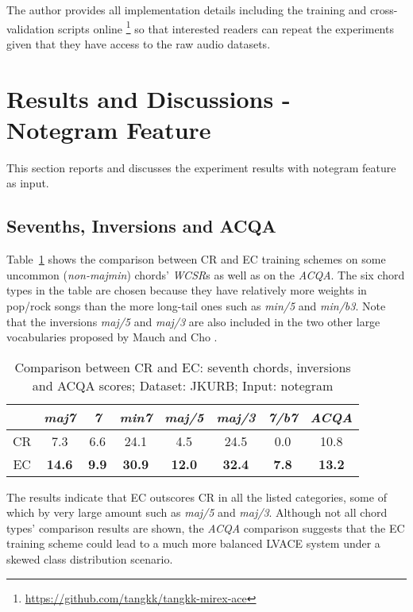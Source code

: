 The author provides all implementation details including the training and cross-validation scripts online \footnote{\url{https://github.com/tangkk/tangkk-mirex-ace}} so that interested readers can repeat the experiments given that they have access to the raw audio datasets.

\section{Results and Discussions - Notegram Feature} \label{sec:4-ng}
This section reports and discusses the experiment results with notegram feature as input.
\subsection{Sevenths, Inversions and ACQA}

Table~\ref{tab:4-acqa} shows the comparison between CR and EC training schemes on some uncommon (\textit{non-majmin}) \cite{burgoyne2011expert} chords' \textit{WCSR}s as well as on the \textit{ACQA}. The six chord types in the table are chosen because they have relatively more weights in pop/rock songs than the more long-tail ones such as \textit{min/5} and \textit{min/b3}. Note that the inversions \textit{maj/5} and \textit{maj/3} are also included in the two other large vocabularies proposed by Mauch \cite{mauch2010automatic} and Cho \cite{cho2014improved}.
\begin{table}[htb]
	\caption{Comparison between CR and EC: seventh chords, inversions and ACQA scores; Dataset: JKURB; Input: notegram}
	\centering
	\scriptsize
	\begin{tabular}{|c|c|c|c|c|c|c|c|} \hline
		& \textit{maj7} & \textit{7} & \textit{min7} & \textit{maj/5} & \textit{maj/3} & \textit{7/b7} & \textit{ACQA} \\ \hline
		CR & 7.3 & 6.6 & 24.1 & 4.5 & 24.5 & 0.0 & 10.8 \\ \hline
		EC &  \textbf{14.6} & \textbf{9.9} & \textbf{30.9 }& \textbf{12.0} & \textbf{32.4} & \textbf{7.8} & \textbf{13.2} \\ \hline
	\end{tabular}
	\label{tab:4-acqa}
\end{table}

The results indicate that EC outscores CR in all the listed categories, some of which by very large amount such as \textit{maj/5} and \textit{maj/3}. Although not all chord types' comparison results are shown, the \textit{ACQA} comparison suggests that the EC training scheme could lead to a much more balanced LVACE system under a skewed class distribution scenario.

